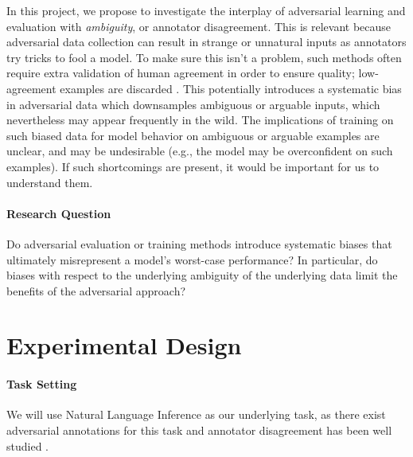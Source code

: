 \documentclass[10pt,a4paper]{article}
\newcommand{\eg}{e.g.}
\begin{document}
In this project, we propose to investigate the interplay of adversarial learning and evaluation with
\textit{ambiguity}, or annotator disagreement.
This is relevant because adversarial data collection can result in strange or unnatural inputs as annotators try tricks to fool a model. To make sure this isn't a problem, such methods often require extra validation of human agreement in order to ensure quality; low-agreement examples are discarded \citep{nie-etal-2020-adversarial}.
This potentially introduces a systematic bias in adversarial data which downsamples ambiguous or arguable inputs, which nevertheless may appear frequently in the wild.
The implications of training on such biased data for model behavior on ambiguous or arguable examples are unclear, and may be undesirable (\eg, the model may be overconfident on such examples).
If such shortcomings are present, it would be important for us to understand them.

\paragraph{Research Question}
Do adversarial evaluation or training methods introduce systematic biases that ultimately
misrepresent a model's worst-case performance? In particular, do biases with respect to the
underlying ambiguity of the underlying data limit the benefits of the adversarial approach?

\section*{Experimental Design}

\paragraph{Task Setting}
We will use Natural Language Inference \citep{dagan2005pascal,bowman2015large} as our underlying task, as there exist adversarial annotations for this task \citep{nie-etal-2020-adversarial,kiela-etal-2021-dynabench} and annotator disagreement has been well studied \citep{pavlick-kwiatkowski-2019-inherent,nie-bansal-2020-learn,zhang-de-marneffe-2021-identifying}.
\end{document}
